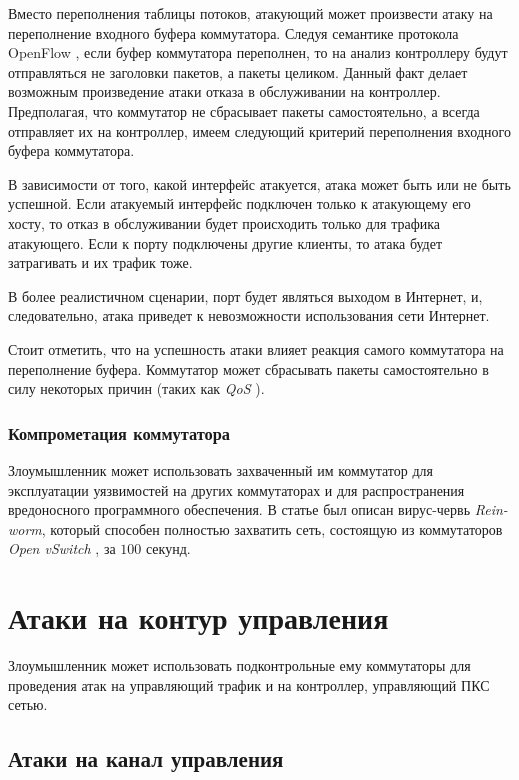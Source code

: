 \documentclass[../thesis.tex]{subfiles}
\begin{document}
Вместо переполнения таблицы потоков, атакующий может произвести атаку на переполнение входного буфера коммутатора.
Следуя семантике протокола OpenFlow \cite{openflow15}, если буфер коммутатора переполнен, то на анализ контроллеру будут отправляться не заголовки пакетов, а пакеты целиком.
Данный факт делает возможным произведение атаки отказа в обслуживании на контроллер.
Предполагая, что коммутатор не сбрасывает пакеты самостоятельно, а всегда отправляет их на контроллер, имеем следующий критерий переполнения входного буфера коммутатора.

В зависимости от того, какой интерфейс атакуется, атака может быть или не быть успешной.
Если атакуемый интерфейс подключен только к атакующему его хосту, то отказ в обслуживании будет происходить только для трафика атакующего.
Если к порту подключены другие клиенты, то атака будет затрагивать и их трафик тоже.

В более реалистичном сценарии, порт будет являться выходом в Интернет, и, следовательно, атака приведет к невозможности использования сети Интернет.

Стоит отметить, что на успешность атаки влияет реакция самого коммутатора на переполнение буфера.
Коммутатор может сбрасывать пакеты самостоятельно в силу некоторых причин (таких как \textit{QoS} \cite{xiao1999internet}).

\subsubsection{Компрометация коммутатора}

Злоумышленник может использовать захваченный им коммутатор для эксплуатации уязвимостей на других коммутаторах и для распространения вредоносного программного обеспечения.
В статье \cite{thimmaraju2016reins} был описан вирус-червь \textit{Rein-worm}, который способен полностью захватить сеть, состоящую из коммутаторов \textit{Open vSwitch} \cite{pfaff2015design}, за $100$ секунд.

\section{Атаки на контур управления}

Злоумышленник может использовать подконтрольные ему коммутаторы для проведения атак на управляющий трафик и на контроллер, управляющий ПКС сетью.

\subsection{Атаки на канал управления}
\end{document}
